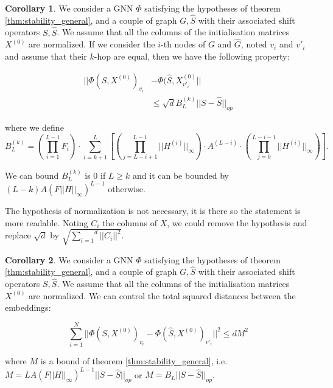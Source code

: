 \documentclass[11pt,a4paper]{article}
\newcommand{\op}[1]{|| #1 ||_{op}}
\newcommand{\ninf}[1]{|| #1 ||_\infty}
\newcommand{\Sum}[2]{\overset{#2}{\underset{#1}{\sum}}}
\newcommand{\Prod}[2]{\overset{#2}{\underset{#1}{\prod}}}
\theoremstyle{definition}
\newtheorem{corollary}{Corollary}[theorem]
\renewcommand{\leq}{\leqslant}
\begin{document}
    \begin{corollary}
    \label{cor:k-hop_node_stability}
    We consider a GNN $\Phi$ satisfying the hypotheses of theorem \ref{thm:stability_general}, and a couple of graph $G,\hat{S}$ with their associated shift operators $S,\hat{S}$. We assume that all the columns of the initialisation matrices $X^{(0)}$ are normalized. If we consider the $i$-th nodes of $G$ and $\hat{G}$, noted $v_i$ and $v'_i$ and assume that their $k$-hop are equal, then we have the following property:
    
    \begin{align}
        || \Phi(S, X^{(0)})_{v_i} &- \Phi(\hat{S}, X ^{(0)}_{v'_i}|| \nonumber \\
        &\leq \sqrt{d} B_L^{(k)} \op{S - \hat{S}}
        \label{eq:k-hop_node_stab}
    \end{align}

    where we define $$ B_L^{(k)} = \left( \Prod{i=1}{L-1} F_i \right)  \cdot \Sum{i=k+1}{L} \left[ (\underset{j=L-i+1}{\overset{L-1}{\prod}} \ninf{H ^{(i)}}) \cdot A^{(L-i)} \cdot (\underset{j=0}{\overset{L-i-1}{\prod}} \ninf{H ^{(i)}}) \right].$$ 

    We can bound $B_L^{(k)}$ is $0$ if $L \geq k$ and it can be bounded by $(L-k) A (F \ninf{H})^{L-1}$ otherwise.

    \end{corollary}

     The hypothesis of normalization is not necessary, it is there so the statement is more readable. Noting $C_i$ the columns of $X$, we could remove the hypothesis and replace $\sqrt{d}$ by $\sqrt{\Sum{i=1}{d} || C_i||^2 }$.


    \begin{corollary}
    \label{cor:global_node_stability}
    We consider a GNN $\Phi$ satisfying the hypotheses of theorem \ref{thm:stability_general}, and a couple of graph $G,\hat{S}$ with their associated shift operators $S,\hat{S}$. We assume that all the columns of the initialisation matrices $X^{(0)}$ are normalized. We can control the total squared distances between the embeddings:
    
    \begin{equation}
        \Sum{i=1}{N} || \Phi(S, X^{(0)})_{v_i} - \Phi(\hat{S}, X ^{(0)})_{v'_i} ||^2 \leq d M^2
        \label{eq:global_node_stab}
    \end{equation}

    where $M$ is a bound of theorem \ref{thm:stability_general}, i.e. $ M = L A (F \ninf{H})^{L-1} \op{S - \hat{S}}$ or $M=B_L \op{S - \hat{S}}$.

    \end{corollary}
\end{document}
